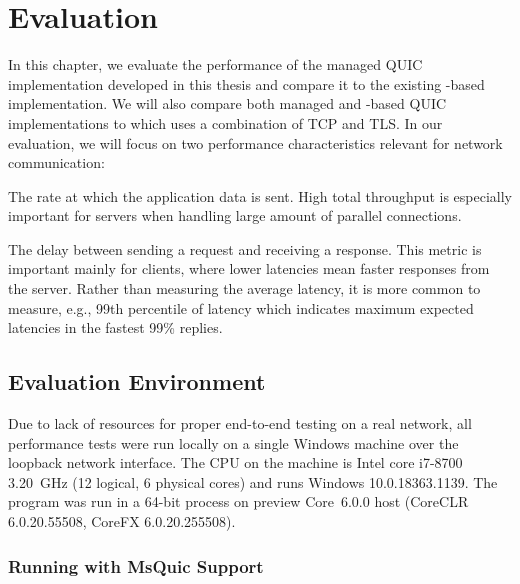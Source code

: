 \chapter{Evaluation}\label{chap:04-evaluation}




In this chapter, we evaluate the performance of the managed QUIC implementation developed in this
thesis and compare it to the existing \libmsquic{}-based implementation. We will also compare both
managed and \libmsquic{}-based QUIC implementations to  which uses a combination of
TCP and TLS. In our evaluation, we will focus on two performance characteristics relevant for
network communication:

\begin{itemize}

   The rate at which the application data is sent. High total throughput is
especially important for servers when handling large amount of parallel connections.

   The delay between sending a request and receiving a response. This
metric is important mainly for clients, where lower latencies mean faster responses from the server.
Rather than measuring the average latency, it is more common to measure, e.g., 99th percentile of
latency which indicates maximum expected latencies in the fastest 99\% replies.

\end{itemize}

\section{Evaluation Environment}

Due to lack of resources for proper end-to-end testing on a real network, all performance tests were
run locally on a single Windows machine over the loopback network interface. The CPU on the machine
is Intel core i7-8700 \SI{3.20}{\giga\hertz} (12 logical, 6 physical cores) and runs Windows
10.0.18363.1139. The program was run in a 64-bit process on preview \dotnet{} Core~6.0.0 host
(CoreCLR 6.0.20.55508, CoreFX 6.0.20.255508).

\subsection{Running with MsQuic Support}

